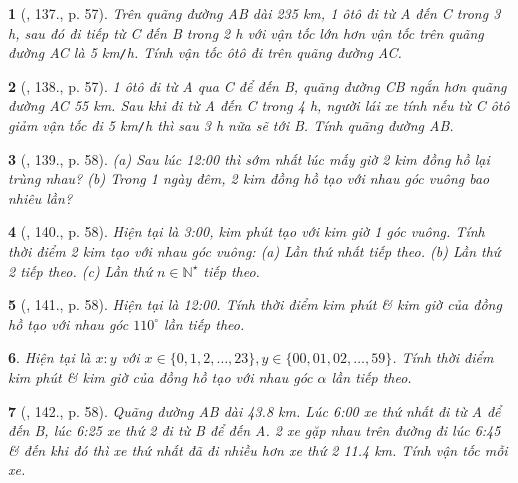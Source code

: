 \documentclass{article}
\newtheorem{baitoan}{}
\begin{document}
\begin{baitoan}[\cite{Binh_Toan_6_tap_2}, 137., p. 57]
	Trên quãng đường AB dài {\rm235 km}, 1 ôtô đi từ A đến C trong {\rm3 h}, sau đó đi tiếp từ C đến B trong {\rm2 h} với vận tốc lớn hơn vận tốc trên quãng đường AC là {\rm5 km{\tt/}h}. Tính vận tốc ôtô đi trên quãng đường AC.
\end{baitoan}

\begin{baitoan}[\cite{Binh_Toan_6_tap_2}, 138., p. 57]
	1 ôtô đi từ A qua C để đến B, quãng đường CB ngắn hơn quãng đường AC {\rm55 km}. Sau khi đi từ A đến C trong {\rm4 h}, người lái xe tính nếu từ C ôtô giảm vận tốc đi {\rm5 km{\tt/}h} thì sau {\rm3 h} nữa sẽ tới B. Tính quãng đường AB.
\end{baitoan}

\begin{baitoan}[\cite{Binh_Toan_6_tap_2}, 139., p. 58]
	(a) Sau lúc {\rm12:00} thì sớm nhất lúc mấy giờ 2 kim đồng hồ lại trùng nhau? (b) Trong 1 ngày đêm, 2 kim đồng hồ tạo với nhau góc vuông bao nhiêu lần?
\end{baitoan}

\begin{baitoan}[\cite{Binh_Toan_6_tap_2}, 140., p. 58]
	Hiện tại là {\rm3:00}, kim phút tạo với kim giờ 1 góc vuông. Tính thời điểm 2 kim tạo với nhau góc vuông: (a) Lần thứ nhất tiếp theo. (b) Lần thứ 2 tiếp theo. (c) Lần thứ $n\in\mathbb{N}^\star$ tiếp theo.
\end{baitoan}

\begin{baitoan}[\cite{Binh_Toan_6_tap_2}, 141., p. 58]
	Hiện tại là {\rm12:00}. Tính thời điểm kim phút \& kim giờ của đồng hồ tạo với nhau góc $110^\circ$ lần tiếp theo.
\end{baitoan}

\begin{baitoan}
	Hiện tại là $x:y$ với $x\in\{0,1,2,\ldots,23\},y\in\{00,01,02,\ldots,59\}$. Tính thời điểm kim phút \& kim giờ của đồng hồ tạo với nhau góc $\alpha$ lần tiếp theo.
\end{baitoan}

\begin{baitoan}[\cite{Binh_Toan_6_tap_2}, 142., p. 58]
	Quãng đường AB dài {\rm43.8 km}. Lúc {\rm6:00} xe thứ nhất đi từ A để đến B, lúc {\rm6:25} xe thứ 2 đi từ B để đến A. 2 xe gặp nhau trên đường đi lúc {\rm6:45} \& đến khi đó thì xe thứ nhất đã đi nhiều hơn xe thứ 2 {\rm11.4 km}. Tính vận tốc mỗi xe.
\end{baitoan}
\end{document}
